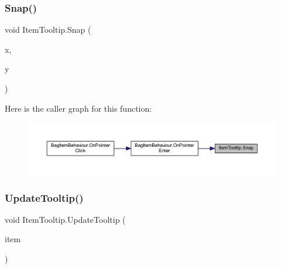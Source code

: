 \subsubsection{\texorpdfstring{Snap()}{Snap()}}
{\footnotesize\ttfamily void Item\+Tooltip.\+Snap (\begin{DoxyParamCaption}\item[{float}]{x,  }\item[{float}]{y }\end{DoxyParamCaption})}

Here is the caller graph for this function\+:
\nopagebreak
\begin{figure}[H]
\begin{center}
\leavevmode
\includegraphics[width=350pt]{class_item_tooltip_ae6eb8ab5acd326e431e46a3df5b76fa4_icgraph}
\end{center}
\end{figure}
\mbox{\label{class_item_tooltip_a51e15cd0c208c14105cc8bedf452385b}} 
\subsubsection{\texorpdfstring{UpdateTooltip()}{UpdateTooltip()}}
{\footnotesize\ttfamily void Item\+Tooltip.\+Update\+Tooltip (\begin{DoxyParamCaption}\item[{\mbox{\hyperlink{class_base_item}{Base\+Item}}}]{item }\end{DoxyParamCaption})}

